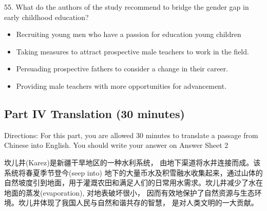 \documentclass[UTF8,11pt]{ctexart}
\begin{document}
55. What do the authors of the study recommend to bridge the gender gap in early childhood education?


\begin{itemize}[leftmargin=2em,itemsep=.2em,topsep=.4em]\item[A.] Recruiting young men who have a passion for education young children
\item[B.] Taking measures to attract prospective male teachers to work in the field.
\item[C.] Persuading prospective fathers to consider a change in their career.
\item[D.] Providing male teachers with more opportunities for advancement.
\end{itemize}

\subsection*{Part IV Translation (30 minutes)}


Directions: For this part, you are allowed 30 minutes to translate a passage from Chinese into English. You should write your answer on Answer Sheet 2


坎儿井(Karez)是新疆干旱地区的一种水利系统， 由地下渠道将水井连接而成。该系统将春夏季节登今(seep into) 地下的大量币水及积雪融水收集起来，通过山体的自然坡度引到地面，用于灌溉农田和满足人们的日常用水需求。坎儿井减少了水在地面的蒸发(evaporation), 对地表破坏很小， 因而有效地保护了自然资源与生态环境。坎儿井体现了我国人民与自然和谐共存的智慧， 是对人类文明的一大贡献。
\end{document}
